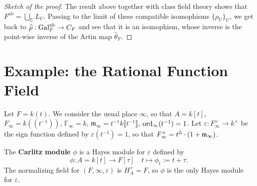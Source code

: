 \documentclass{article}
\newcommand{\F}{\mathbb{F}}
\newcommand{\m}{\mathfrak{m}}
\newcommand{\llpar}{(\!(}
\newcommand{\rrpar}{)\!)}
\newcommand{\ab}{\mathrm{ab}}
\begin{document}
\begin{proof}[Sketch of the proof]
The result above together with class field theory shows that $F^\ab = \bigcup_{U}L_U$.
Passing to the limit of these compatible isomophisms $\{\rho_U\}_U$, we get back to $\hat\rho : \gal_F^\ab\to C_F$ and see that it is an isomophism,
whose inverse is the point-wise inverse of the Artin map $\hat\theta_F$.
\end{proof}


\section{Example: the Rational Function Field}
Let $F = k(t)$.
We consider the usual place $\infty$, so that $A = k[t]$,
$F_\infty = k\llpar t^{-1}\rrpar$,
$\F_\infty = k$,
$\m_\infty = t^{-1}k\llbracket t^{-1}\rrbracket$,
$\operatorname{ord}_{\infty}(t^{-1}) = 1$.
Let $\varepsilon : F_\infty^\times\to k^\times$ be the sign function defined by $\varepsilon(t^{-1}) = 1$,
so that $F_\infty^+ = t^{\Z}\cdot(1 + \m_\infty)$.


The \textbf{Carlitz module} $\phi$ is a Hayes module for $\varepsilon$ defined by \[\phi : A = k[t]\to F[\tau]\quad t\mapsto \phi_t := t + \tau.\]
The normalizing field for $(F, \infty, \varepsilon)$ is $H_A^+ = F$,
so $\phi$ is the only Hayes module for $\varepsilon$.
\end{document}
